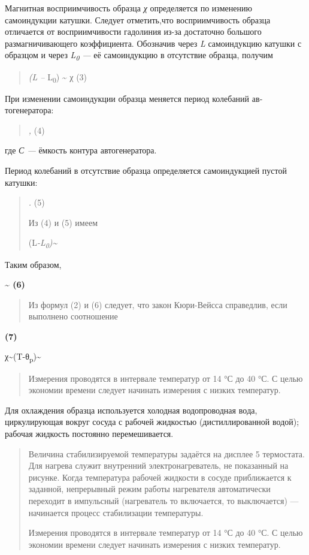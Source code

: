 \documentclass[]{article}
\begin{document}
Магнитная восприимчивость образца \emph{χ} определяется по изменению
самоиндукции катушки. Следует отметить,что восприимчивость образца
отличается от восприимчивости гадолиния из-за достаточно большого
размагничивающего коэффициента. Обозначив через \emph{L} самоиндукцию
катушки с образцом и через \emph{\textsc{L\textsubscript{0}} ---} её
самоиндукцию в отсутствие образца, по­лучим

\begin{quote}
\emph{(L --} L\textsubscript{0}) \textasciitilde{} χ (3)
\end{quote}

При изменении самоиндукции образца меняется период колебаний
ав­тогенератора:

\begin{quote}
\emph{\textsc{,}} (4)
\end{quote}

где \emph{С ---} ёмкость контура автогенератора.

Период колебаний в отсутствие образца определяется самоиндукци­ей пустой
катушки:

\begin{quote}
\emph{.} (5)

Из (4) и (5) имеем

(L\emph{-L\textsubscript{0})\textasciitilde{}}
\end{quote}

Таким образом,

\textbf{\textasciitilde{} (6)}

\begin{quote}
Из формул (2) и (6) следует, что закон Кюри-Вейсса справедлив, если
выполнено соотношение
\end{quote}

\textbf{(7)}

χ\textasciitilde{}(T-θ\textsubscript{p})\textasciitilde{}

\begin{quote}
Измерения проводятся в интервале температур от 14 °С до 40 °С. С целью
экономии времени следует начинать измерения с низких тем­ператур.
\end{quote}

Для охлаждения образца используется холодная водопроводная во­да,
циркулирующая вокруг сосуда с рабочей жидкостью (дистиллиро­ванной
водой); рабочая жидкость постоянно перемешивается.

\begin{quote}
Величина стабилизируемой температуры задаётся на дисплее 5 тер­мостата.
Для нагрева служит внутренний электронагреватель, не по­казанный на
рисунке. Когда температура рабочей жидкости в сосуде приближается к
заданной, непрерывный режим работы нагревателя ав­томатически переходит
в импульсный (нагреватель то включается, то выключается) --- начинается
процесс стабилизации температуры.

Измерения проводятся в интервале температур от 14 °С до 40 °С. С целью
экономии времени следует начинать измерения с низких тем­ператур.
\end{quote}
\end{document}
